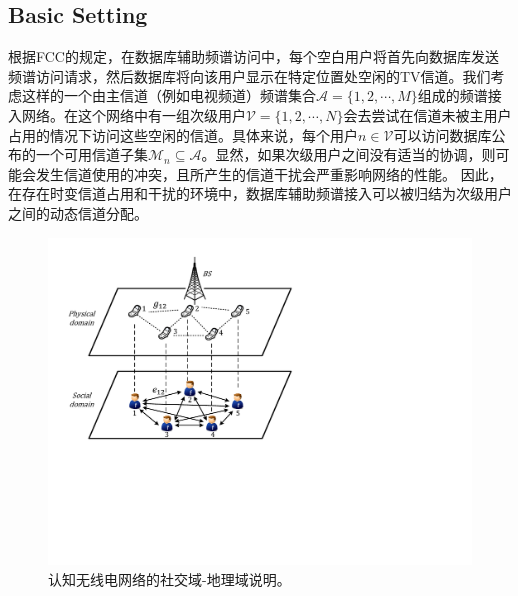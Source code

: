 \subsection{Basic Setting}\label{sec:system-model}
根据FCC\cite{FCC}的规定，在数据库辅助频谱访问中，每个空白用户将首先向数据库发送频谱访问请求，然后数据库将向该用户显示在特定位置处空闲的TV信道。我们考虑这样的一个由主信道（例如电视频道）频谱集合$\mathcal{A}=\{1,2,\cdots,M\}$组成的频谱接入网络。在这个网络中有一组次级用户$\mathcal{V}=\{1,2,\cdots,N\}$会去尝试在信道未被主用户占用的情况下访问这些空闲的信道。具体来说，每个用户$n\in\mathcal{V}$可以访问数据库公布的一个可用信道子集$\mathcal{M}_n\subseteq\mathcal{A}$。显然，如果次级用户之间没有适当的协调，则可能会发生信道使用的冲突，且所产生的信道干扰会严重影响网络的性能。 {\kaishu 因此，在存在时变信道占用和干扰的环境中，数据库辅助频谱接入可以被归结为次级用户之间的动态信道分配。}
\begin{figure}[!t]
\centering
\includegraphics[scale=0.43]{./pic/sysfig1.pdf}
\caption{认知无线电网络的社交域-地理域说明。}\label{fg:domain}
\end{figure}

